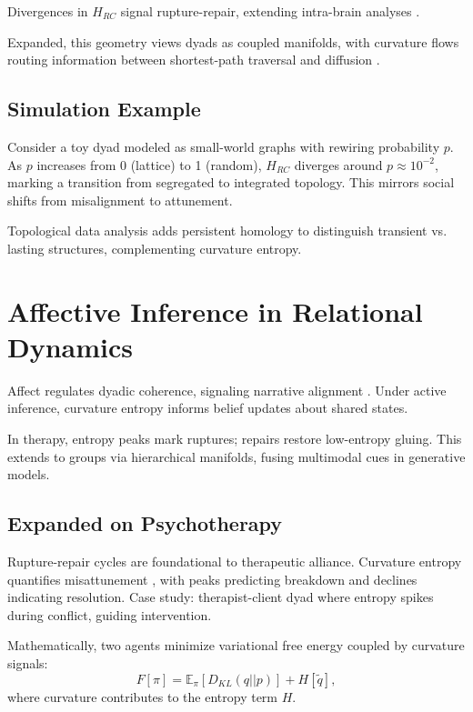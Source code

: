 \documentclass{article}
\theoremstyle{definition}
\begin{document}
Divergences in $H_{RC}$ signal rupture-repair, extending intra-brain analyses \citep{weber2019curvature,chatterjee2021detecting}.

Expanded, this geometry views dyads as coupled manifolds, with curvature flows routing information between shortest-path traversal and diffusion \citep{avena2019spectrum}.

\subsection{Simulation Example}

Consider a toy dyad modeled as small-world graphs with rewiring probability $p$. As $p$ increases from 0 (lattice) to 1 (random), $H_{RC}$ diverges around $p \approx 10^{-2}$, marking a transition from segregated to integrated topology. This mirrors social shifts from misalignment to attunement.

Topological data analysis adds persistent homology to distinguish transient vs. lasting structures, complementing curvature entropy.

\section{Affective Inference in Relational Dynamics}

Affect regulates dyadic coherence, signaling narrative alignment \citep{hinrichs2025hyperscanning}. Under active inference, curvature entropy informs belief updates about shared states.

In therapy, entropy peaks mark ruptures; repairs restore low-entropy gluing. This extends to groups via hierarchical manifolds, fusing multimodal cues in generative models.

\subsection{Expanded on Psychotherapy}

Rupture-repair cycles are foundational to therapeutic alliance. Curvature entropy quantifies misattunement \citep{bolis2017dialectical}, with peaks predicting breakdown and declines indicating resolution. Case study: therapist-client dyad where entropy spikes during conflict, guiding intervention.

Mathematically, two agents minimize variational free energy coupled by curvature signals:
\[
F[\pi] = \mathbb{E}_\pi [D_{KL}(q||p)] + H[\tilde{q}],
\]
where curvature contributes to the entropy term $H$.
\end{document}
